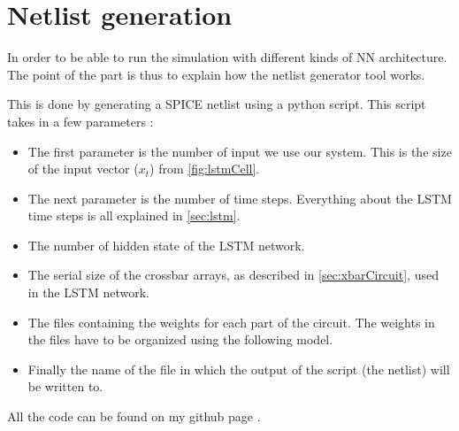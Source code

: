 \section{Netlist generation}
\label{sec:netlist}

In order to be able to run the simulation with different kinds of \ac{NN} architecture. The point of the part is thus to explain how the netlist generator tool works.

This is done by generating a SPICE netlist using a python script. This script takes in a few parameters :

\begin{itemize}
\item The first parameter is the number of input we use our system. This is the size of the input vector ($x_t$) from \cref{fig:lstmCell}.
\item The next parameter is the number of time steps. Everything about the \ac{LSTM} time steps is all explained in \cref{sec:lstm}.
\item The number of hidden state of the \ac{LSTM} network.
\item The serial size of the crossbar arrays, as described in \cref{sec:xbarCircuit}, used in the \ac{LSTM} network.
\item The files containing the weights for each part of the circuit. The weights in the files have to be organized using the following model. %
\item Finally the name of the file in which the output of the script (the netlist) will be written to.
\end{itemize}


All the code can be found on my github page \cite{lstmGen}.
